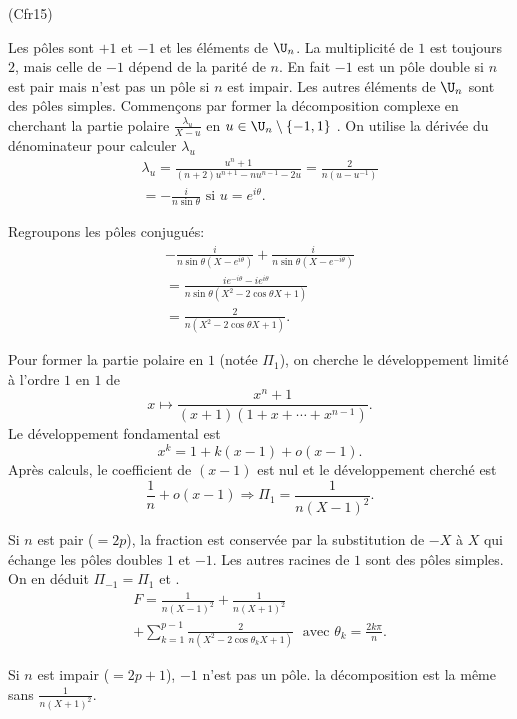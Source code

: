 \begin{tiny}(Cfr15)\end{tiny} Les pôles sont $+1$ et $-1$ et les éléments de $\U_n$. La multiplicité de $1$ est toujours $2$, mais celle de $-1$ dépend de la parité de $n$. En fait $-1$ est un pôle double si $n$ est pair mais n'est pas un pôle si $n$ est impair. Les autres éléments de $\U_n$ sont des pôles simples.\newline
Commençons par former la décomposition complexe en cherchant la partie polaire $\frac{\lambda_u}{X-u}$ en $u \in \U_n \setminus \lbrace -1, 1\rbrace$ . On utilise la dérivée du dénominateur pour calculer $\lambda_u$
\begin{multline*}
  \lambda_u = \frac{u^n + 1}{(n+2)u^{n+1}- nu^{n-1} - 2u}
  = \frac{2}{n(u - u^{-1})}\\
  = -  \frac{i}{n\sin \theta} \text{ si } u = e^{i \theta}.
\end{multline*}

Regroupons les pôles conjugués:
\begin{multline*}
  -  \frac{i}{n\sin \theta(X-e^{i\theta})}  + \frac{i}{n\sin \theta(X-e^{-i\theta}) } \\
  = \frac{ie^{-i\theta} - ie^{i\theta}}{n\sin \theta(X^2 - 2\cos \theta X + 1)}\\
  = \frac{2}{n(X^2 - 2\cos \theta X + 1)}.
\end{multline*}

Pour former la partie polaire en $1$ (notée $\Pi_1$), on cherche le développement limité à l'ordre $1$ en $1$
de
\[
  x \mapsto \frac{x^n + 1}{(x+1)(1+x+\cdots +x^{n-1})}.
\]
Le développement fondamental est 
\[
  x^k = 1 + k(x-1) + o(x-1).
\]
Après calculs, le coefficient de $(x-1)$ est nul et le développement cherché est
\[
  \frac{1}{n} + o(x-1)
  \Rightarrow \Pi_1 = \frac{1}{n(X-1)^2}.
\]

Si $n$ est pair ($ = 2p$), la fraction est conservée par la substitution de $-X$ à $X$ qui échange les pôles doubles $1$ et $-1$. Les autres racines de $1$ sont des pôles simples. On en déduit $\Pi_{-1} = \Pi_1$ et .
\begin{multline*}
  F = \frac{1}{n(X-1)^2} + \frac{1}{n(X+1)^2} \\ 
  + \sum_{k=1}^{p-1}\frac{2}{n(X^2 - 2\cos \theta_k X + 1)}
  \; \text{ avec } \theta_k = \frac{2 k \pi}{n}.
\end{multline*}

Si $n$ est impair ($ = 2p+1$), $-1$ n'est pas un pôle. la décomposition est la même sans $\frac{1}{n(X+1)^2}$. 
